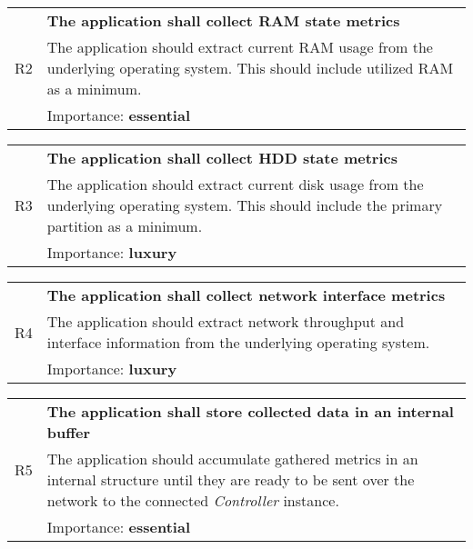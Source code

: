            \vspace{0.5cm}
            \noindent
            \begin{tabular}{ p{0.7cm}|p{14.5cm} }
                \multirow{3}{*}{R2 } & \textbf{The application shall collect RAM state metrics}\\
                \cline{2-2}
                & The application should extract current RAM usage from the underlying operating system. This should include utilized RAM as a minimum.\\
                \cline{2-2}
                & Importance: \textbf{essential}
            \end{tabular}

            \vspace{0.5cm}
            \noindent
            \begin{tabular}{ p{0.7cm}|p{14.5cm} }
                \multirow{3}{*}{R3 } & \textbf{The application shall collect HDD state metrics}\\
                \cline{2-2}
                & The application should extract current disk usage from the underlying operating system. This should include the primary partition as a minimum.\\
                \cline{2-2}
                & Importance: \textbf{luxury}
            \end{tabular}

            \vspace{0.5cm}
            \noindent
            \begin{tabular}{ p{0.7cm}|p{14.5cm} }
                \multirow{3}{*}{R4 } & \textbf{The application shall collect network interface metrics}\\
                \cline{2-2}
                & The application should extract network throughput and interface information from the underlying operating system.\\
                \cline{2-2}
                & Importance: \textbf{luxury}
            \end{tabular}

            \vspace{0.5cm}
            \noindent
            \begin{tabular}{ p{0.7cm}|p{14.5cm} }
                \multirow{3}{*}{R5 } & \textbf{The application shall store collected data in an internal buffer}\\
                \cline{2-2}
                & The application should accumulate gathered metrics in an internal structure until they are ready to be sent over the network to the connected \textit{Controller} instance.\\
                \cline{2-2}
                & Importance: \textbf{essential}
            \end{tabular}

